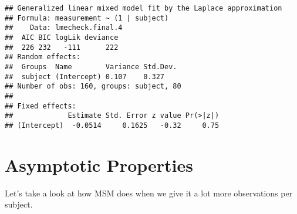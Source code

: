 \documentclass{article}\usepackage{graphicx, color}
\makeatletter
\newenvironment{kframe}{%
 \def\at@end@of@kframe{}%
 \ifinner\ifhmode%
  \def\at@end@of@kframe{\end{minipage}}%
  \begin{minipage}{\columnwidth}%
 \fi\fi%
 \def\FrameCommand##1{\hskip\@totalleftmargin \hskip-\fboxsep
 \colorbox{shadecolor}{##1}\hskip-\fboxsep
     \hskip-\linewidth \hskip-\@totalleftmargin \hskip\columnwidth}%
 \MakeFramed {\advance\hsize-\width
   \@totalleftmargin\z@ \linewidth\hsize
   \@setminipage}}%
 {\par\unskip\endMakeFramed%
 \at@end@of@kframe}
\newenvironment{knitrout}{}{} %
\makeatother
\begin{document}
\begin{knitrout}
\begin{kframe}
\begin{alltt}
\end{alltt}
\begin{verbatim}
## Generalized linear mixed model fit by the Laplace approximation 
## Formula: measurement ~ (1 | subject) 
##    Data: lmecheck.final.4 
##  AIC BIC logLik deviance
##  226 232   -111      222
## Random effects:
##  Groups  Name        Variance Std.Dev.
##  subject (Intercept) 0.107    0.327   
## Number of obs: 160, groups: subject, 80
## 
## Fixed effects:
##             Estimate Std. Error z value Pr(>|z|)
## (Intercept)  -0.0514     0.1625   -0.32     0.75
\end{verbatim}
\end{kframe}
\end{knitrout}


\newpage\section{Asymptotic Properties}

Let's take a look at how MSM does when we give it a lot more observations per subject.
\end{document}
